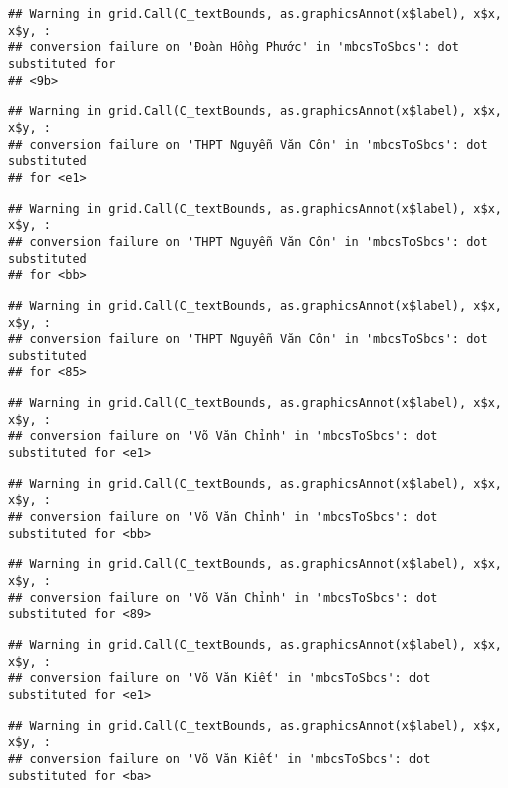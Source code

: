 \documentclass[
]{article}
\begin{document}
\begin{verbatim}
## Warning in grid.Call(C_textBounds, as.graphicsAnnot(x$label), x$x, x$y, :
## conversion failure on 'Đoàn Hồng Phước' in 'mbcsToSbcs': dot substituted for
## <9b>
\end{verbatim}

\begin{verbatim}
## Warning in grid.Call(C_textBounds, as.graphicsAnnot(x$label), x$x, x$y, :
## conversion failure on 'THPT Nguyễn Văn Côn' in 'mbcsToSbcs': dot substituted
## for <e1>
\end{verbatim}

\begin{verbatim}
## Warning in grid.Call(C_textBounds, as.graphicsAnnot(x$label), x$x, x$y, :
## conversion failure on 'THPT Nguyễn Văn Côn' in 'mbcsToSbcs': dot substituted
## for <bb>
\end{verbatim}

\begin{verbatim}
## Warning in grid.Call(C_textBounds, as.graphicsAnnot(x$label), x$x, x$y, :
## conversion failure on 'THPT Nguyễn Văn Côn' in 'mbcsToSbcs': dot substituted
## for <85>
\end{verbatim}

\begin{verbatim}
## Warning in grid.Call(C_textBounds, as.graphicsAnnot(x$label), x$x, x$y, :
## conversion failure on 'Võ Văn Chỉnh' in 'mbcsToSbcs': dot substituted for <e1>
\end{verbatim}

\begin{verbatim}
## Warning in grid.Call(C_textBounds, as.graphicsAnnot(x$label), x$x, x$y, :
## conversion failure on 'Võ Văn Chỉnh' in 'mbcsToSbcs': dot substituted for <bb>
\end{verbatim}

\begin{verbatim}
## Warning in grid.Call(C_textBounds, as.graphicsAnnot(x$label), x$x, x$y, :
## conversion failure on 'Võ Văn Chỉnh' in 'mbcsToSbcs': dot substituted for <89>
\end{verbatim}

\begin{verbatim}
## Warning in grid.Call(C_textBounds, as.graphicsAnnot(x$label), x$x, x$y, :
## conversion failure on 'Võ Văn Kiết' in 'mbcsToSbcs': dot substituted for <e1>
\end{verbatim}

\begin{verbatim}
## Warning in grid.Call(C_textBounds, as.graphicsAnnot(x$label), x$x, x$y, :
## conversion failure on 'Võ Văn Kiết' in 'mbcsToSbcs': dot substituted for <ba>
\end{verbatim}
\end{document}
